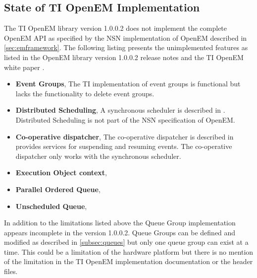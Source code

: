 \subsection{State of TI OpenEM Implementation}
\label{subsec:ti-implementation-state}
The TI OpenEM library version 1.0.0.2 does not implement the complete OpenEM API as specified by the NSN implementation of OpenEM described in \ref{sec:emframework}. The following listing presents the unimplemented features as listed in the OpenEM library version 1.0.0.2 release notes \cite{openemnotes} and the TI OpenEM white paper \cite{openemwhite}.

\begin{itemize}
    \item \textbf{Event Groups},
        The TI implementation of event groups is functional but lacks the functionality to delete event groups.
    \item \textbf{Distributed Scheduling},
        A synchronous scheduler is described in \cite{openemwhite}. Distributed Scheduling is not part of the NSN specification of OpenEM.
    \item \textbf{Co-operative dispatcher},
        The co-operative dispatcher is described in \cite{openemwhite} provides services for suspending and resuming events. The co-operative dispatcher only works with the synchronous scheduler.
    \item \textbf{Execution Object context},
    \item \textbf{Parallel Ordered Queue},
    \item \textbf{Unscheduled Queue},
\end{itemize}

In addition to the limitations listed above the Queue Group implementation appears incomplete in the version 1.0.0.2. Queue Groups can be defined and modified as described in \ref{subsec:queues} but only one queue group can exist at a time. This could be a limitation of the hardware platform but there is no mention of the limitation in the TI OpenEM implementation documentation or the header files.


